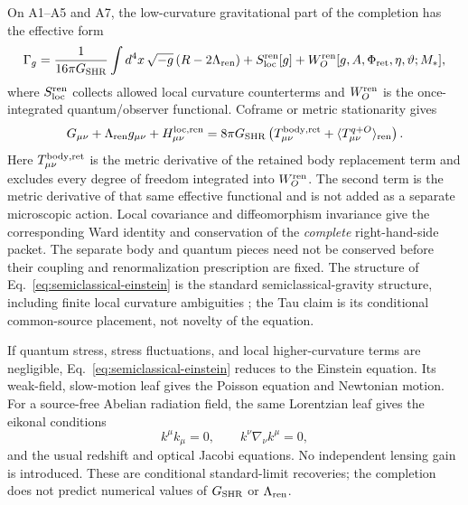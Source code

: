 \documentclass[11pt]{article}
\begin{document}
On A1--A5 and A7, the low-curvature gravitational part of the completion has
the effective form
\begin{equation}
  \Gamma_g=\frac{1}{16\pi G_{\rm SHR}}
  \int d^4x\,\sqrt{-g}\,(R-2\Lambda_{\rm ren})
  +S_{\rm loc}^{\rm ren}[g]
  +W_O^{\rm ren}[g,A,\Phi_{\rm ret},\eta,\vartheta;M_*],
  \label{eq:gravity-effective-action}
\end{equation}
where \(S_{\rm loc}^{\rm ren}\) collects allowed local curvature counterterms
and \(W_O^{\rm ren}\) is the once-integrated quantum/observer functional.
Coframe or metric
stationarity gives
\begin{equation}
  G_{\mu\nu}+\Lambda_{\rm ren}g_{\mu\nu}
  +H_{\mu\nu}^{\rm loc,ren}
  =8\pi G_{\rm SHR}
\left(T_{\mu\nu}^{\rm body,ret}
  +\langle T_{\mu\nu}^{q+O}\rangle_{\rm ren}\right).
  \label{eq:semiclassical-einstein}
\end{equation}
Here \(T_{\mu\nu}^{\rm body,ret}\) is the metric derivative of the retained
body replacement term and excludes every degree of freedom integrated into
\(W_O^{\rm ren}\).  The second term is the metric derivative of that same
effective functional and is not added as a separate microscopic action.
Local covariance and diffeomorphism invariance give the corresponding Ward
identity and conservation of the \emph{complete} right-hand-side packet.  The
separate body and quantum pieces need not be conserved before their coupling
and renormalization prescription are fixed.  The structure of
Eq.~\eqref{eq:semiclassical-einstein} is the standard semiclassical-gravity
structure, including finite local curvature ambiguities
\cite{Wald1977,HollandsWald2001,HollandsWald2002,HuVerdaguer2008}; the Tau
claim is its conditional common-source placement, not novelty of the equation.

If quantum stress, stress fluctuations, and local higher-curvature terms are
negligible, Eq.~\eqref{eq:semiclassical-einstein} reduces to the Einstein
equation.  Its weak-field, slow-motion leaf gives the Poisson equation and
Newtonian motion.  For a source-free Abelian radiation field, the same
Lorentzian leaf gives the eikonal conditions
\begin{equation}
  k^\mu k_\mu=0,
  \qquad k^\nu\nabla_\nu k^\mu=0,
  \label{eq:geometric-optics}
\end{equation}
and the usual redshift and optical Jacobi equations.  No independent lensing
gain is introduced.  These are conditional standard-limit recoveries; the
completion does not predict numerical values of \(G_{\rm SHR}\) or
\(\Lambda_{\rm ren}\).
\end{document}
